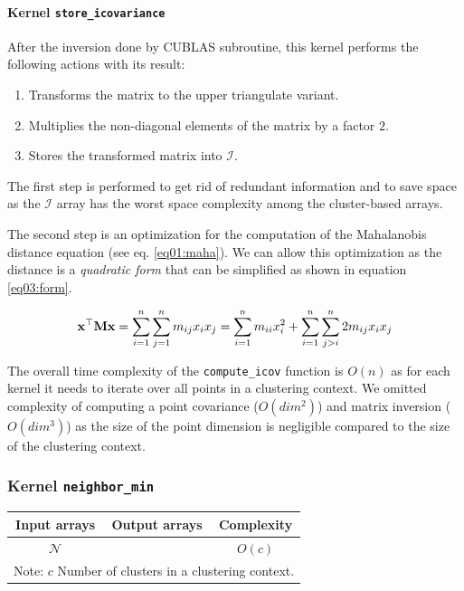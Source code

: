 \paragraph{Kernel \texttt{store\_icovariance}}
After the inversion done by CUBLAS subroutine, this kernel performs the following actions with its result:
\begin{enumerate}
	\item Transforms the matrix to the upper triangulate variant.
	\item Multiplies the non-diagonal elements of the matrix by a factor $2$.
	\item Stores the transformed matrix into $\mathcal{I}$.
\end{enumerate}

The first step is performed to get rid of redundant information and to save space as the $\mathcal{I}$ array has the worst space complexity among the cluster-based arrays.

The second step is an optimization for the computation of the Mahalanobis distance equation (see eq. \ref{eq01:maha}). We can allow this optimization as the distance is a \emph{quadratic form} that can be simplified as shown in equation \ref{eq03:form}.

\begin{equation}
\mathbf{x}^\top\mathbf{M}\mathbf{x} = \sum_{i=1}^{n}\sum_{j=1}^{n}{m_{ij}x_ix_j} = \sum_{i=1}^{n}{m_{ii}x_i^2} + \sum_{i=1}^{n}\sum_{j>i}^{n}{2m_{ij}x_ix_j}
\label{eq03:form}
\end{equation}


\begin{rem}
The overall time complexity of the \texttt{compute\_icov} function is $O(n)$ as for each kernel it needs to iterate over all points in a clustering context. We omitted complexity of computing a point covariance ($O(dim^2)$) and matrix inversion ($O(dim^3)$) as the size of the point dimension is negligible compared to the size of the clustering context.
\end{rem}

\subsubsection{Kernel \texttt{neighbor\_min}}

\begin{table}[h]
	\centering
	\begin{tabular}{ccc}
		\toprule
		\textbf{Input arrays} & \textbf{Output arrays} & \textbf{Complexity} \\ \midrule
		    $\mathcal{N}$     &                        &       $O(c)$        \\ \bottomrule
	    	\multicolumn{3}{l}{\footnotesize Note: $c$ Number of clusters in a clustering context.}
	\end{tabular}
\end{table}

